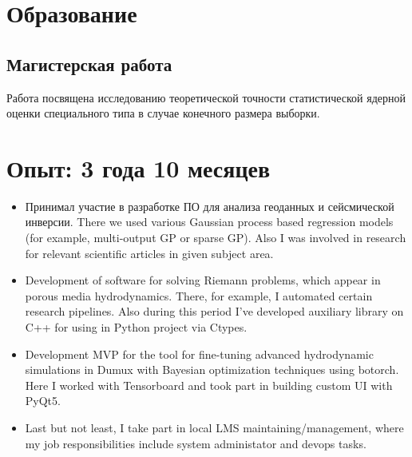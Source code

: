 \documentclass[12pt,a4paper]{moderncv}
\begin{document}
\makecvtitle

\section{Образование}

\subsection{Магистерская работа}

Работа посвящена исследованию теоретической точности статистической ядерной оценки специального типа в случае конечного размера выборки.

\section{Опыт: 3 года 10 месяцев}
\begin{itemize}
\item Принимал участие в разработке ПО для анализа геоданных и сейсмической инверсии. There we used various Gaussian process based regression models (for example, multi-output GP or sparse GP). Also I was involved in research for relevant scientific articles in given subject area. \newline
\item Development of software for solving Riemann problems, which appear in porous media hydrodynamics.
There, for example, I automated certain research pipelines. Also during this period I've developed auxiliary library on C++ for using in Python project via Ctypes. \newline
\item Development MVP for the tool for fine-tuning advanced hydrodynamic simulations in Dumux with Bayesian optimization techniques using botorch. Here I worked with Tensorboard and took part in building custom UI with PyQt5. \newline
\item Last but not least, I take part in local LMS maintaining/management, where my job responsibilities include system administator and devops tasks. \newline
\end{itemize}
\end{document}
